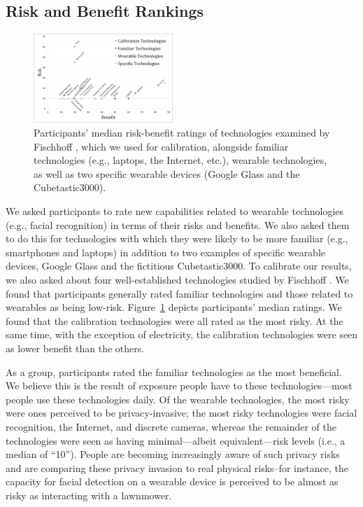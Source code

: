 \subsection{Risk and Benefit Rankings} 
\begin{figure}[t]
	\centering
	\includegraphics[width=0.47\textwidth]{images/riskbenefit.pdf}
	\caption{Participants' median risk-benefit ratings of technologies examined by Fischhoff \etal\cite{Fischhoff}, which we used for calibration, alongside familiar technologies (e.g., laptops, the Internet, etc.), wearable technologies, as well as two specific wearable devices (Google Glass and the Cubetastic3000).}
	\label{fig:techplot}
\end{figure}

We asked participants to rate new capabilities related to wearable technologies (e.g., facial recognition) in terms of their risks and benefits. We also asked them to do this for technologies with which they were likely to be more familiar (e.g., smartphones and laptops) in addition to two examples of specific wearable devices, Google Glass and the fictitious Cubetastic3000. To calibrate our results, we also asked about four well-established technologies studied by Fischhoff \etal\cite{Fischhoff}. We found that participants generally rated familiar technologies and those related to wearables as being low-risk. Figure~\ref{fig:techplot} depicts participants' median ratings. We found that the calibration technologies were all rated as the most risky. At the same time, with the exception of electricity, the calibration technologies were seen as lower benefit than the others.

As a group, participants rated the familiar technologies as the most beneficial. We believe this is the result of exposure people have to these technologies---most people use these technologies daily. Of the wearable technologies, the most risky were ones perceived to be privacy-invasive; the most risky technologies were facial recognition, the Internet, and discrete cameras, whereas the remainder of the technologies were seen as having minimal---albeit equivalent---risk levels (i.e., a median of ``10''). People are becoming increasingly aware of such privacy risks and are comparing these privacy invasion to real physical risks--for instance, the capacity for facial detection on a wearable device is perceived to be almost as risky as interacting with a lawnmower.

